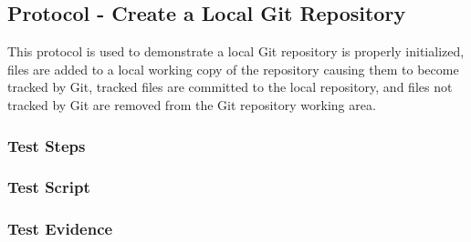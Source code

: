 \newpage
\subsection{Protocol - Create a Local Git Repository}
This protocol is used to demonstrate a local Git repository is properly
initialized, files are added to a local working copy of the repository
causing them to become tracked by Git, tracked files are committed to
the local repository, and files not tracked by Git are removed from the
Git repository working area.

\subsubsection{Test Steps}
      {}
      {}

\newpage
\subsubsection{Test Script}


\newpage
\subsubsection{Test Evidence}
      {}
      {}
